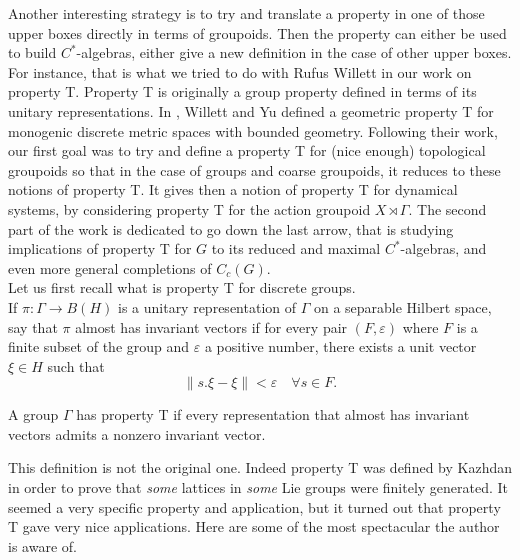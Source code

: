Another interesting strategy is to try and translate a property in one of those upper boxes directly in terms of groupoids. Then the property can either be used to build $C^*$-algebras, either give a new definition in the case of other upper boxes. For instance, that is what we tried to do with Rufus Willett in our work on property T. Property T is originally a group property defined in terms of its unitary representations. In \cite{WillettYu}, Willett and Yu defined a geometric property T for monogenic discrete metric spaces with bounded geometry. Following their work, our first goal was to try and define a property T for (nice enough) topological groupoids so that in the case of groups and coarse groupoids, it reduces to these notions of property T. It gives then a notion of property T for dynamical systems, by considering property T for the action groupoid $X\rtimes \Gamma$. The second part of the work is dedicated to go down the last arrow, that is studying implications of property T for $G$ to its reduced and maximal $C^*$-algebras, and even more general completions of $C_c(G)$.\\

Let us first recall what is property T for discrete groups.\\

If $\pi : \Gamma \rightarrow B(H)$ is a unitary representation of $\Gamma$ on a separable Hilbert space, say that $\pi$ almost has invariant vectors if for every pair $(F,\varepsilon)$ where $F$ is a finite subset of the group and $\varepsilon$ a positive number, there exists a unit vector $\xi\in H$ such that 
\[ \| s.\xi - \xi \| < \varepsilon\quad \forall s\in F. \]
\begin{definition}
A group $\Gamma$ has property T if every representation that almost has invariant vectors admits a nonzero invariant vector.
\end{definition}

This definition is not the original one. Indeed property T was defined by Kazhdan in order to prove that \textit{some} lattices in \textit{some} Lie groups were finitely generated. It seemed a very specific property and application, but it turned out that property T gave very nice applications. Here are some of the most spectacular the author is aware of.\\

